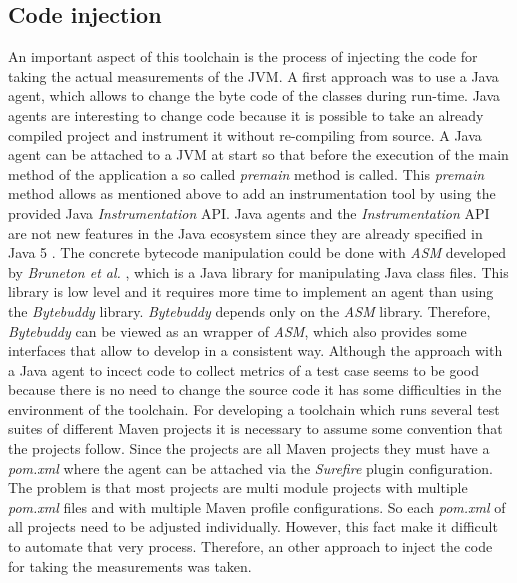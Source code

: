 \documentclass{seal_thesis}
\begin{document}
\subsection{Code injection} \label{sec:code_injection}
An important aspect of this toolchain is the process of injecting the code for taking the actual measurements of the JVM. A first approach was to use a Java agent, which allows to change the byte code of the classes during run-time. Java agents are interesting to change code because it is possible to take an already compiled project and instrument it without re-compiling from source. A Java agent can be attached to a JVM at start so that before the execution of the main method of the application a so called \textit{premain} method is called. This \textit{premain} method allows as mentioned above to add an instrumentation tool by using the provided Java \textit{Instrumentation} API. Java agents and the \textit{Instrumentation} API are not new features in the Java ecosystem since they are already specified in Java 5 \cite{java5}. The concrete bytecode manipulation could be done with \textit{ASM} developed by \textit{Bruneton et al.} \cite{bruneton02}, which is a Java library for manipulating Java class files. This library is low level and it requires more time to implement an agent than using the \textit{Bytebuddy} \cite{bytebuddy} library. \textit{Bytebuddy} depends only on the \textit{ASM} library. Therefore, \textit{Bytebuddy} can be viewed as an wrapper of \textit{ASM}, which also provides some interfaces that allow to develop in a consistent way. Although the approach with a Java agent to incect code to collect metrics of a test case seems to be good because there is no need to change the source code it has some difficulties in the environment of the toolchain. For developing a toolchain which runs several test suites of different Maven projects it is necessary to assume some convention that the projects follow. Since the projects are all Maven projects they must have a \textit{pom.xml} where the agent can be attached via the \textit{Surefire} plugin configuration. The problem is that most projects are multi module projects with multiple \textit{pom.xml} files and with multiple Maven profile configurations. So each \textit{pom.xml} of all projects need to be adjusted individually. However, this fact make it difficult to automate that very process. Therefore, an other approach to inject the code for taking the measurements was taken. \\
\end{document}
